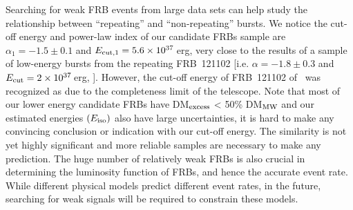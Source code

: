 \documentclass[fleqn,usenatbib]{mnras}
\begin{document}
 Searching for weak FRB events from large data sets can help study the relationship between ``repeating'' and ``non-repeating'' bursts. We notice the  cut-off energy and power-law index of our candidate FRBs sample are $\alpha_{1}=-1.5\pm0.1$ and $E_{\rm cut,1}=5.6\times10^{37}$\,erg, very close to the results of a
sample of low-energy bursts from the repeating FRB~121102 [i.e. $\alpha=-1.8\pm0.3$ and $E_{\rm cut}=2\times10^{37}$\,erg, \citep{Gourdji2019}]. However, the cut-off energy of FRB~121102 of~\citet{Gourdji2019} was recognized as due to the completeness limit of the telescope. Note that most of our lower energy candidate FRBs have DM$_{\rm excess}$ < 50\% DM$_{\rm MW}$ and our estimated energies $(E_{\rm iso})$ also have large uncertainties, it is hard to make any convincing conclusion or indication with our cut-off energy.
The similarity is not yet highly significant and more reliable samples are necessary to make any prediction. 
The huge number of relatively weak FRBs is also crucial in determining the luminosity function of FRBs, and hence the accurate event rate. While different physical models predict different event rates, in the future, searching for weak signals will be required to constrain these models.
%
%
%
%
%
\end{document}
